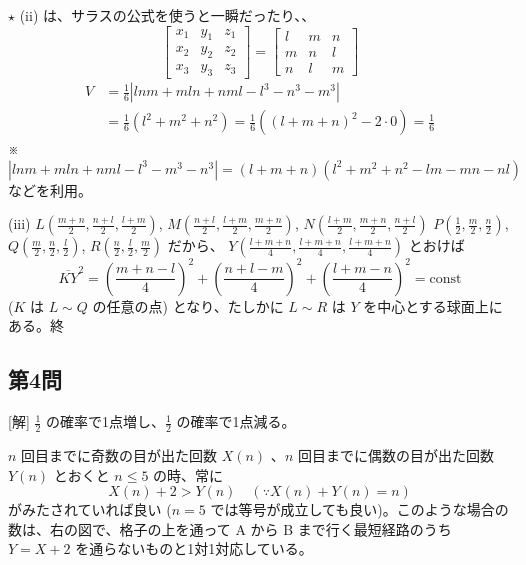 \documentclass[../main.tex]{subfiles}
\begin{document}
$\star$ (ii) は、サラスの公式を使うと一瞬だったり、、
\[
  \left[
    \begin{array}{ccc}
      x_1 & y_1 & z_1 \\
      x_2 & y_2 & z_2 \\
      x_3 & y_3 & z_3
  \end{array} \right]
  =
  \left[
    \begin{array}{ccc}
      l & m & n \\
      m & n & l \\
      n & l & m
  \end{array} \right]
\]
\begin{align*}
  V &= \frac{1}{6} \left| lnm + mln + nml - l^3 - n^3 - m^3 \right| \\
  &= \frac{1}{6} (l^2+m^2+n^2) = \frac{1}{6} ((l+m+n)^2-2\cdot 0) = \frac{1}{6}
\end{align*}
※ $\left| lnm+mln+nml - l^3-m^3-n^3 \right| = (l+m+n)(l^2+m^2+n^2-lm-mn-nl)$ などを利用。

(iii) $L\left(\frac{m+n}{2}, \frac{n+l}{2}, \frac{l+m}{2}\right)$, $M\left(\frac{n+l}{2}, \frac{l+m}{2}, \frac{m+n}{2}\right)$, $N\left(\frac{l+m}{2}, \frac{m+n}{2}, \frac{n+l}{2}\right)$
$P\left(\frac{1}{2}, \frac{m}{2}, \frac{n}{2}\right)$, $Q\left(\frac{m}{2}, \frac{n}{2}, \frac{l}{2}\right)$, $R\left(\frac{n}{2}, \frac{l}{2}, \frac{m}{2}\right)$ だから、
$Y\left(\frac{l+m+n}{4}, \frac{l+m+n}{4}, \frac{l+m+n}{4}\right)$ とおけば
\[ \overline{KY}^2 = \left(\frac{m+n-l}{4}\right)^2 + \left(\frac{n+l-m}{4}\right)^2 + \left(\frac{l+m-n}{4}\right)^2 = \text{const} \]
($K$ は $L \sim Q$ の任意の点) となり、たしかに $L \sim R$ は $Y$ を中心とする球面上にある。終

\subsection*{第4問}
[解] $\frac{1}{2}$ の確率で1点増し、$\frac{1}{2}$ の確率で1点減る。

$n$ 回目までに奇数の目が出た回数 $X(n)$ 、$n$ 回目までに偶数の目が出た回数 $Y(n)$ とおくと $n \le 5$ の時、常に
\[ X(n)+2 > Y(n) \quad (\because X(n)+Y(n)=n) \]
がみたされていれば良い ($n=5$ では等号が成立しても良い)。このような場合の数は、右の図で、格子の上を通って A から B まで行く最短経路のうち $Y=X+2$ を通らないものと1対1対応している。

\begin{center}
\end{center}
\end{document}
